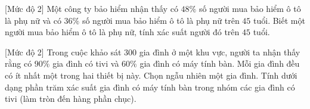 \begin{bt}%
[Mức độ 2]%
	Một công ty bảo hiểm nhận thấy có $48 \%$ số người mua bảo hiểm ô tô là phụ nữ và có $36 \%$ số người mua bảo hiểm ô tô là phụ nữ trên $45$ tuổi. Biết một người mua bảo hiểm ô tô là phụ nữ, tính xác suất người đó trên $45$ tuổi.
\end{bt}

\begin{bt}%
[Mức độ 2]%
	Trong cuộc khảo sát $300$ gia đình ở một khu vực, người ta nhận thấy rằng có $90\%$ gia đình có tivi và $60\%$ gia đình có máy tính bàn. Mỗi gia đình đều có ít nhất một trong hai thiết bị này. Chọn ngẫu nhiên một gia đình. Tính dưới dạng phần trăm xác suất gia đình có máy tính bàn trong nhóm các gia đình có tivi (làm tròn đến hàng phần chục).
\end{bt}

